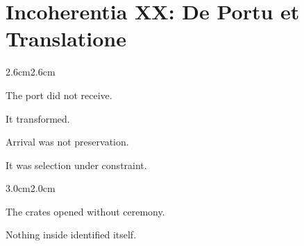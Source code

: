 
\chapter*{Incoherentia XX: De Portu et Translatione}

\pagestyle{incoherence}

\vspace{2em}

\begin{adjustwidth}{2.6cm}{2.6cm}

The port did not receive.

\medskip

It transformed.

\vspace{2em}

Arrival was not preservation.

\medskip

It was selection under constraint.

\vspace{3em}

\end{adjustwidth}

\begin{center}

\medskip


\medskip

\end{center}

\vspace{3em}

\begin{adjustwidth}{3.0cm}{2.0cm}

The crates opened without ceremony.

\medskip

Nothing inside identified itself.

\vspace{3em}

\end{adjustwidth}

